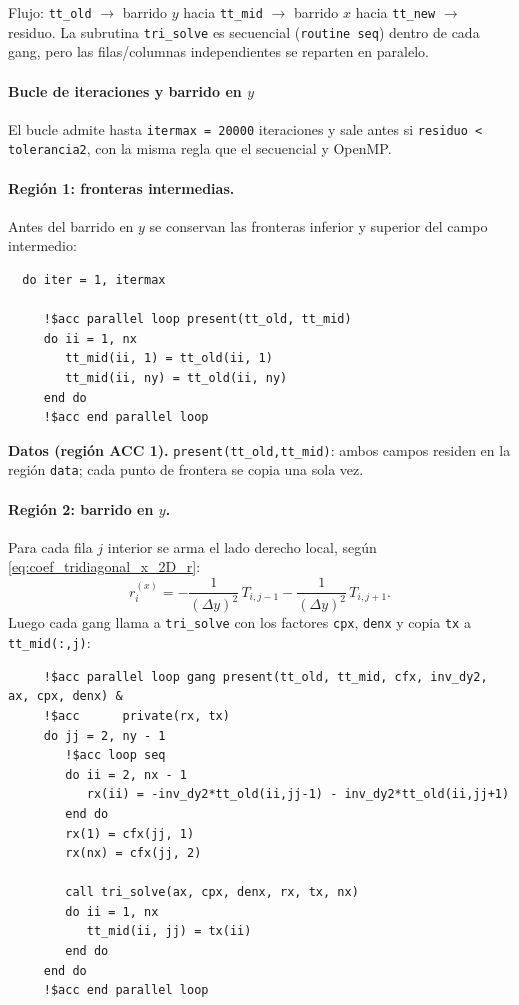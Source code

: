 \documentclass[11pt,a4paper]{article}
\begin{document}
Flujo: \texttt{tt\_old} $\rightarrow$ barrido $y$ hacia \texttt{tt\_mid}
$\rightarrow$ barrido $x$ hacia \texttt{tt\_new} $\rightarrow$ residuo. La
subrutina \texttt{tri\_solve} es secuencial (\texttt{routine seq}) dentro de
cada gang, pero las filas/columnas independientes se reparten en paralelo.

\medskip

\paragraph{Bucle de iteraciones y barrido en $y$}

\medskip

El bucle admite hasta \texttt{itermax = 20000} iteraciones y sale antes si
\texttt{residuo < tolerancia2}, con la misma regla que el secuencial y OpenMP.

\paragraph{Regi\'on 1: fronteras intermedias.}
Antes del barrido en $y$ se conservan las fronteras inferior y superior del
campo intermedio:

\begin{verbatim}
  do iter = 1, itermax

     !$acc parallel loop present(tt_old, tt_mid)
     do ii = 1, nx
        tt_mid(ii, 1) = tt_old(ii, 1)
        tt_mid(ii, ny) = tt_old(ii, ny)
     end do
     !$acc end parallel loop
\end{verbatim}

\noindent\textbf{Datos (regi\'on ACC 1).} \texttt{present(tt\_old,tt\_mid)}:
ambos campos residen en la regi\'on \texttt{data}; cada punto de frontera se
copia una sola vez.

\paragraph{Regi\'on 2: barrido en $y$.}
Para cada fila $j$ interior se arma el lado derecho local, seg\'un
\ref{eq:coef_tridiagonal_x_2D_r}:
\begin{equation}
r_i^{(x)} = -\frac{1}{(\Delta y)^2}\,T_{i,j-1}-\frac{1}{(\Delta y)^2}\,T_{i,j+1}.
\end{equation}
Luego cada gang llama a \texttt{tri\_solve} con los factores \texttt{cpx},
\texttt{denx} y copia \texttt{tx} a \texttt{tt\_mid(:,j)}:

\begin{verbatim}
     !$acc parallel loop gang present(tt_old, tt_mid, cfx, inv_dy2, ax, cpx, denx) &
     !$acc      private(rx, tx)
     do jj = 2, ny - 1
        !$acc loop seq
        do ii = 2, nx - 1
           rx(ii) = -inv_dy2*tt_old(ii,jj-1) - inv_dy2*tt_old(ii,jj+1)
        end do
        rx(1) = cfx(jj, 1)
        rx(nx) = cfx(jj, 2)

        call tri_solve(ax, cpx, denx, rx, tx, nx)
        do ii = 1, nx
           tt_mid(ii, jj) = tx(ii)
        end do
     end do
     !$acc end parallel loop
\end{verbatim}
\end{document}
